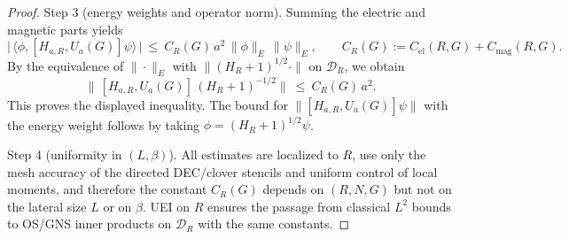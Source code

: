 \documentclass[11pt]{amsart}
\theoremstyle{plain}
\theoremstyle{definition}
\theoremstyle{remark}
\begin{document}
\begin{proof}
Step 3 (energy weights and operator norm). Summing the electric and magnetic parts yields
\[
  \big|\,\langle\phi,[H_{a,R},U_a(G)]\psi\rangle\,\big|\ \le\ C_R(G)\, a^2\, \|\phi\|_{E}\,\|\psi\|_{E},\qquad C_R(G):=C_{\mathrm{el}}(R,G)+C_{\mathrm{mag}}(R,G).
\]
By the equivalence of $\|\cdot\|_{E}$ with $\|(H_R+1)^{1/2}\cdot\|$ on $\mathcal D_R$, we obtain
\[
  \big\|\,[H_{a,R},U_a(G)]\,(H_R+1)^{-1/2}\big\|\ \le\ C_R(G)\, a^2.
\]
This proves the displayed inequality. The bound for $\|[H_{a,R},U_a(G)]\psi\|$ with the energy weight follows by taking $\phi=(H_R+1)^{1/2}\psi$.

Step 4 (uniformity in $(L,\beta)$). All estimates are localized to $R$, use only the mesh accuracy of the directed DEC/clover stencils and uniform control of local moments, and therefore the constant $C_R(G)$ depends on $(R,N,G)$ but not on the lateral size $L$ or on $\beta$. UEI on $R$ ensures the passage from classical $L^2$ bounds to OS/GNS inner products on $\mathcal D_R$ with the same constants.
\end{proof}
\end{document}
